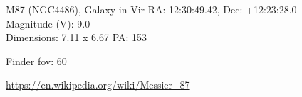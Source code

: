 \begin{block}{M87 (NGC4486), Galaxy in Vir}
    RA: 12:30:49.42, Dec: +12:23:28.0 \\ 
    Magnitude (V): 9.0 \\ 
    Dimensions: 7.11 x 6.67 PA: 153 

    Finder fov: 60 

    \url{https://en.wikipedia.org/wiki/Messier_87} 
\end{block}